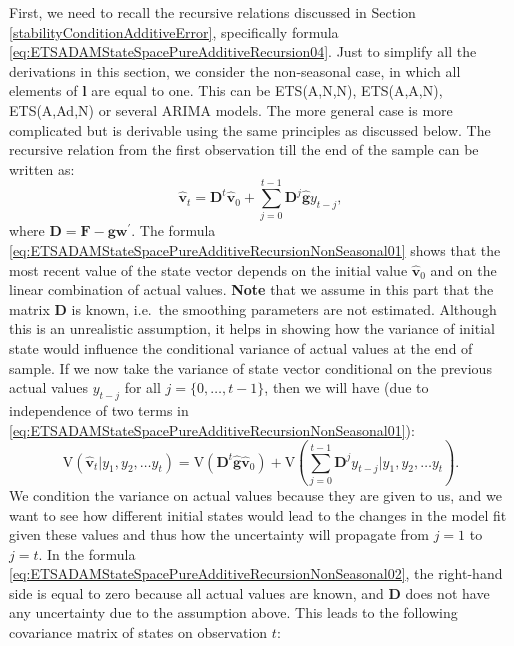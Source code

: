 \documentclass[]{book}
\theoremstyle{definition}
\theoremstyle{definition}
\theoremstyle{definition}
\theoremstyle{definition}
\theoremstyle{remark}
\begin{document}
First, we need to recall the recursive relations discussed in Section \ref{stabilityConditionAdditiveError}, specifically formula \eqref{eq:ETSADAMStateSpacePureAdditiveRecursion04}. Just to simplify all the derivations in this section, we consider the non-seasonal case, in which all elements of \(\mathbf{l}\) are equal to one. This can be ETS(A,N,N), ETS(A,A,N), ETS(A,Ad,N) or several ARIMA models. The more general case is more complicated but is derivable using the same principles as discussed below. The recursive relation from the first observation till the end of the sample can be written as:
\begin{equation}
    \hat{\mathbf{v}}_{t} = \mathbf{D}^{t} \hat{\mathbf{v}}_{0} + \sum_{j=0}^{t-1} \mathbf{D}^{j} \hat{\mathbf{g}} y_{t-j} ,
  \label{eq:ETSADAMStateSpacePureAdditiveRecursionNonSeasonal01}
\end{equation}
where \(\mathbf{D}=\mathbf{F} -\mathbf{g}\mathbf{w}^\prime\). The formula \eqref{eq:ETSADAMStateSpacePureAdditiveRecursionNonSeasonal01} shows that the most recent value of the state vector depends on the initial value \(\hat{\mathbf{v}}_{0}\) and on the linear combination of actual values. \textbf{Note} that we assume in this part that the matrix \(\mathbf{D}\) is known, i.e.~the smoothing parameters are not estimated. Although this is an unrealistic assumption, it helps in showing how the variance of initial state would influence the conditional variance of actual values at the end of sample. If we now take the variance of state vector conditional on the previous actual values \(y_{t-j}\) for all \(j=\{0, \dots, t-1 \}\), then we will have (due to independence of two terms in \eqref{eq:ETSADAMStateSpacePureAdditiveRecursionNonSeasonal01}):
\begin{equation}
    \mathrm{V}(\hat{\mathbf{v}}_{t} | y_1, y_2, \dots y_t) = \mathrm{V}\left( \mathbf{D}^{t} \hat{\mathbf{g}} \hat{\mathbf{v}}_{0} \right) + \mathrm{V}\left(\sum_{j=0}^{t-1} \mathbf{D}^{j} y_{t-j} | y_1, y_2, \dots y_t \right) .
  \label{eq:ETSADAMStateSpacePureAdditiveRecursionNonSeasonal02}
\end{equation}
We condition the variance on actual values because they are given to us, and we want to see how different initial states would lead to the changes in the model fit given these values and thus how the uncertainty will propagate from \(j=1\) to \(j=t\). In the formula \eqref{eq:ETSADAMStateSpacePureAdditiveRecursionNonSeasonal02}, the right-hand side is equal to zero because all actual values are known, and \(\mathbf{D}\) does not have any uncertainty due to the assumption above. This leads to the following covariance matrix of states on observation \(t\):
\end{document}
